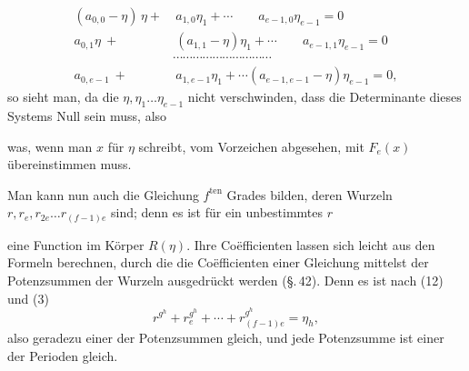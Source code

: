 
\[
\begin{aligned}
(a_{0,0} - \eta)\,\eta + &\ a_{1,0}\eta_1 + \cdots \hspace{2em} a_{e-1,0}\eta_{e-1} = 0 \\
a_{0,1}\eta \ + &\ (a_{1,1} - \eta)\eta_1 + \cdots \hspace{2em} a_{e-1,1}\eta_{e-1} = 0 \\
&\cdots\cdots\cdots\cdots\cdots\cdots\cdots\cdots\cdots\cdots \\
a_{0,e-1} \ + &\ a_{1,e-1}\eta_1 + \cdots (a_{e-1,e-1} - \eta)\eta_{e-1} = 0,
\end{aligned}
\]
so sieht man, da die $\eta, \eta_1 \ldots \eta_{e-1}$ nicht verschwinden, dass die Determinante dieses Systems Null sein muss, also


was, wenn man $x$ für $\eta$ schreibt, vom Vorzeichen abgesehen, mit $F_e(x)$ übereinstimmen muss.


Man kann nun auch die Gleichung $f^{\mathrm{ten}}$ Grades bilden, deren Wurzeln $r, r_e, r_{2e} \ldots r_{(f-1)e}$ sind; denn es ist für ein unbestimmtes $r$


eine Function im Körper $R(\eta)$. Ihre Coëfficienten lassen sich leicht aus den  Formeln berechnen, durch die die Coëfficienten einer Gleichung mittelst der Potenzsummen der Wurzeln ausgedrückt werden (\S.\,42). Denn es ist nach (12) und (3)
\[
r^{g^h} + r_e^{g^h} + \cdots + r_{(f-1)e}^{g^h} = \eta_h,
\]
also geradezu einer der Potenzsummen gleich, und jede Potenzsumme ist einer der Perioden gleich.

